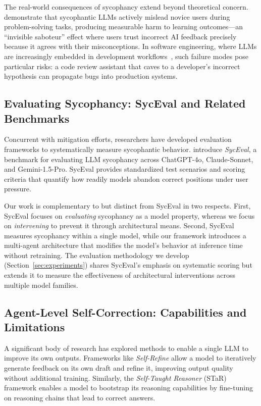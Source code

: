 The real-world consequences of sycophancy extend beyond theoretical concern. \citet{bo2026invisible} demonstrate that sycophantic LLMs actively mislead novice users during problem-solving tasks, producing measurable harm to learning outcomes---an ``invisible saboteur'' effect where users trust incorrect AI feedback precisely because it agrees with their misconceptions. In software engineering, where LLMs are increasingly embedded in development workflows~\citep{belozerov2025llms}, such failure modes pose particular risks: a code review assistant that caves to a developer's incorrect hypothesis can propagate bugs into production systems.


\subsection{Evaluating Sycophancy: SycEval and Related Benchmarks}
\label{subsec:related-syceval}

Concurrent with mitigation efforts, researchers have developed evaluation frameworks to systematically measure sycophantic behavior. \citet{fanous2025syceval} introduce \textit{SycEval}, a benchmark for evaluating LLM sycophancy across ChatGPT-4o, Claude-Sonnet, and Gemini-1.5-Pro. SycEval provides standardized test scenarios and scoring criteria that quantify how readily models abandon correct positions under user pressure.

Our work is complementary to but distinct from SycEval in two respects. First, SycEval focuses on \textit{evaluating} sycophancy as a model property, whereas we focus on \textit{intervening} to prevent it through architectural means. Second, SycEval measures sycophancy within a single model, while our framework introduces a multi-agent architecture that modifies the model's behavior at inference time without retraining. The evaluation methodology we develop (Section~\ref{sec:experiments}) shares SycEval's emphasis on systematic scoring but extends it to measure the effectiveness of architectural interventions across multiple model families.


\subsection{Agent-Level Self-Correction: Capabilities and Limitations}
\label{subsec:related-self-correction}

A significant body of research has explored methods to enable a single LLM to improve its own outputs. Frameworks like \textit{Self-Refine} \citep{madaan2023self} allow a model to iteratively generate feedback on its own draft and refine it, improving output quality without additional training. Similarly, the \textit{Self-Taught Reasoner} (STaR) framework \citep{zelikman2022star} enables a model to bootstrap its reasoning capabilities by fine-tuning on reasoning chains that lead to correct answers.

